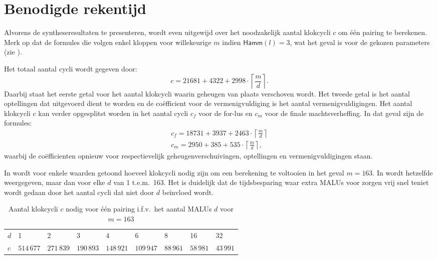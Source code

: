 \section{Benodigde rekentijd}

Alvorens de syntheseresultaten te presenteren, wordt even uitgewijd over het noodzakelijk aantal klokcycli $c$ om \'e\'en pairing te berekenen. Merk op dat de formules die volgen enkel kloppen voor willekeurige $m$ indien $\textsf{Hamm}(l) = 3$, wat het geval is voor de gekozen parameters (zie ).

Het totaal aantal cycli wordt gegeven door:
\[c = 21681 + 4322 + 2998 \cdot \left\lceil \frac{m}{d} \right\rceil.\]
Daarbij staat het eerste getal voor het aantal klokcycli waarin geheugen van plaats verschoven wordt. Het tweede getal is het aantal optellingen dat uitgevoerd dient te worden en de co\"efficient voor de vermenigvuldiging is het aantal vermenigvuldigingen. Het aantal klokcycli $c$ kan verder opgesplitst worden in het aantal cycli $c_f$ voor de for-lus en $c_m$ voor de finale machtsverheffing. In dat geval zijn de formules:
\[\begin{gathered}
c_f = 18731 + 3937 + 2463 \cdot \left\lceil \frac{m}{d} \right\rceil\\
c_m = 2950 + 385 + 535 \cdot \left\lceil \frac{m}{d} \right\rceil,
\end{gathered}\]
waarbij de co\"efficienten opnieuw voor respectievelijk geheugenverschuivingen, optellingen en vermenigvuldigingen staan.

In  wordt voor enkele waarden getoond hoeveel klokcycli nodig zijn om een berekening te voltooien in het geval $m = 163$. In  wordt hetzelfde weergegeven, maar dan voor elke $d$ van 1 t.e.m.\ 163. Het is duidelijk dat de tijdsbesparing waar extra MALUs voor zorgen vrij snel teniet wordt gedaan door het aantal cycli dat niet door $d$ be\"invloed wordt.

\begin{table}[h]
	\caption{Aantal klokcycli $c$ nodig voor \'e\'en pairing i.f.v.\ het aantal MALUs $d$ voor $m = 163$}
	\label{tabel-resultaten-multi-cycles}

	\begin{narrow}{-1cm}{-1cm}
		\centering
		\begin{tabular}{lllllllll}
			\toprule
			$d$	& 1	& 2	& 3	& 4	& 6	& 8	& 16	& 32\\
			$c$	& $514\,677$	& $271\,839$	& $190\,893$	& $148\,921$	& $109\,947$	& $88\,961$	& $58\,981$	& $43\,991$\\
			\bottomrule	
		\end{tabular}
	\end{narrow}
\end{table}

